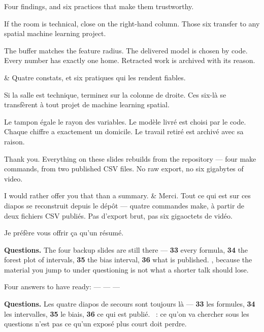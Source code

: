 \documentclass[10pt,a4paper]{article}
\begin{document}
\begin{say}
Four findings, and six practices that make them trustworthy.

If the room is technical, close on the right-hand column. Those six transfer to
any spatial machine learning project.

The buffer matches the feature radius. The delivered model is chosen by code.
Every number has exactly one home. Retracted work is archived with its reason.

&
Quatre constats, et six pratiques qui les rendent fiables.

Si la salle est technique, terminez sur la colonne de droite. Ces six-là se
transfèrent à tout projet de machine learning spatial.

Le tampon égale le rayon des variables. Le modèle livré est choisi par le code.
Chaque chiffre a exactement un domicile. Le travail retiré est archivé avec sa
raison.

\end{say}

\begin{say}
Thank you. Everything on these slides rebuilds from the repository --- four make
commands, from two published CSV files. No raw export, no six gigabytes of video.

I would rather offer you that than a summary.
&
Merci. Tout ce qui est sur ces diapos se reconstruit depuis le dépôt --- quatre
commandes make, à partir de deux fichiers CSV publiés. Pas d'export brut, pas six
gigaoctets de vidéo.

Je préfère vous offrir ça qu'un résumé.
\end{say}

\vspace{6mm}
\noindent
\colorbox{wash}{\parbox{\dimexpr\textwidth-2\fboxsep}{\vspace{1.5mm}
\textbf{Questions.} The four backup slides are still there --- \textbf{33} every
formula, \textbf{34} the forest plot of intervals, \textbf{35} the bias interval,
\textbf{36} what is published. , because the
material you jump to under questioning is not what a shorter talk should lose.

\medskip
Four answers to have ready:  ---
 ---  --- 

\medskip
{}
\textbf{Questions.} Les quatre diapos de secours sont toujours là ---
\textbf{33} les formules, \textbf{34} les intervalles, \textbf{35} le biais,
\textbf{36} ce qui est publié. ~: ce
qu'on va chercher sous les questions n'est pas ce qu'un exposé plus court doit
perdre.
\vspace{1.5mm}}}
\end{document}
